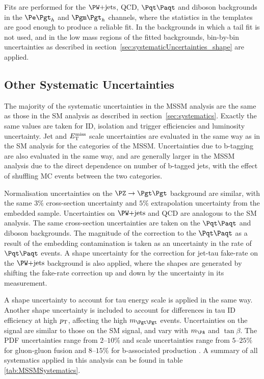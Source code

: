 Fits are performed for the $\WJets$, QCD, $\ttbar$ and diboson backgrounds in the $\etau$
and $\mutau$ channels, where the statistics in the templates are good enough to
produce a reliable fit. In the backgrounds in which a tail fit is not used, and
in the low mass regions of the fitted backgrounds, bin-by-bin uncertainties as
described in section~\ref{sec:systematicUncertainties_shape} are applied.

\subsection{Other Systematic Uncertainties}
The majority of the systematic uncertainties in the \ac{MSSM} analysis are the
same as those in the \ac{SM} analysis as described in
section~\ref{sec:systematics}. Exactly the same values are taken for ID, isolation and
trigger efficiencies and luminosity uncertainty. Jet and $E_{\mathrm{T}}^{\text{miss}}$ scale
uncertainties are evaluated in the same way as in the \ac{SM} analysis 
for the categories of the \ac{MSSM}. 
Uncertainties due to b-tagging are also evaluated in the same way, 
and are generally larger in the \ac{MSSM} analysis due to
the direct dependence on number of b-tagged jets, with the effect of shuffling 
\ac{MC} events between the two categories.   

Normalisation uncertainties on the $\ZToTauTau$ background are similar, with the
same $3\%$ cross-section uncertainty and $5\%$ extrapolation uncertainty from
the embedded sample. Uncertainties on $\WJets$ and QCD are analogous to the
\ac{SM} analysis. The same cross-section uncertainties are taken on the $\ttbar$
and diboson backgrounds. The magnitude of the correction to the $\ttbar$ as a result 
of the embedding contamination is taken as an uncertainty in the rate of $\ttbar$ events. A shape 
uncertainty for the correction for jet-tau fake-rate on the $\WJets$ background
is also applied, where the shapes are generated by shifting the fake-rate
correction up and down by the uncertainty in its measurement. 

A shape uncertainty to account for tau energy scale is applied in the same way. 
Another shape uncertainty is included to account for differences in tau ID
efficiency at high $p_{\mathrm{T}}$, affecting the high $m_{\Pgt\Pgt}$ events. 
Uncertainties on the signal are similar to those on the \ac{SM} signal, and vary
with $m_{\PA}$ and $\tan\beta$. The \ac{PDF} uncertainties range from $2$--$10\%$ and scale uncertainties range from
$5$--$25\%$ for gluon-gluon fusion and $8$--$15\%$ for b-associated production
\cite{HIG-13-021}. A summary of all systematics applied in this analysis can be
found in table \ref{tab:MSSMSystematics}.

